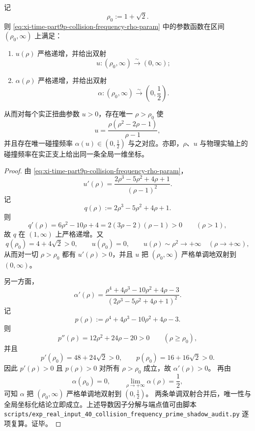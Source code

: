 \begin{theorem}[实正扭曲分支的全局单调坐标化]\label{thm:xi-time-part9p-positive-branch-global-coordinate}
记
\[
\rho_0:=1+\sqrt2.
\]
则 \eqref{eq:xi-time-part9p-collision-frequency-rho-param} 中的参数函数在区间 \((\rho_0,\infty)\) 上满足：
\begin{enumerate}
  \item \(u(\rho)\) 严格递增，并给出双射
  \[
  u:(\rho_0,\infty)\xrightarrow{\sim}(0,\infty);
  \]
  \item \(\alpha(\rho)\) 严格递增，并给出双射
  \[
  \alpha:(\rho_0,\infty)\xrightarrow{\sim}\left(0,\frac12\right).
  \]
\end{enumerate}
从而对每个实正扭曲参数 \(u>0\)，存在唯一 \(\rho>\rho_0\) 使
\[
u=\frac{\rho(\rho^2-2\rho-1)}{\rho-1},
\]
并且存在唯一碰撞频率 \(\alpha(u)\in(0,\tfrac12)\) 与之对应。亦即，\(\rho\)、\(u\) 与物理实轴上的碰撞频率在实正支上给出同一条全局一维坐标。
\end{theorem}
\begin{proof}
由 \eqref{eq:xi-time-part9p-collision-frequency-rho-param}，
\[
u'(\rho)=\frac{2\rho^3-5\rho^2+4\rho+1}{(\rho-1)^2}.
\]
记
\[
q(\rho):=2\rho^3-5\rho^2+4\rho+1.
\]
则
\[
q'(\rho)=6\rho^2-10\rho+4=2(3\rho-2)(\rho-1)>0
\qquad(\rho>1),
\]
故 \(q\) 在 \((1,\infty)\) 上严格递增。又
\[
q(\rho_0)=4+4\sqrt2>0,
\qquad
u(\rho_0)=0,
\qquad
u(\rho)\sim \rho^2\to+\infty
\quad(\rho\to+\infty),
\]
从而对一切 \(\rho>\rho_0\) 都有 \(u'(\rho)>0\)，并且 \(u\) 把 \((\rho_0,\infty)\) 严格单调地双射到 \((0,\infty)\)。

另一方面，
\[
\alpha'(\rho)=
\frac{\rho^4+4\rho^3-10\rho^2+4\rho-3}
{(2\rho^3-5\rho^2+4\rho+1)^2}.
\]
记
\[
p(\rho):=\rho^4+4\rho^3-10\rho^2+4\rho-3.
\]
则
\[
p''(\rho)=12\rho^2+24\rho-20>0
\qquad(\rho\ge \rho_0),
\]
并且
\[
p'(\rho_0)=48+24\sqrt2>0,
\qquad
p(\rho_0)=16+16\sqrt2>0.
\]
因此 \(p'(\rho)>0\) 且 \(p(\rho)>0\) 对所有 \(\rho>\rho_0\) 成立，故 \(\alpha'(\rho)>0\)。
再由
\[
\alpha(\rho_0)=0,
\qquad
\lim_{\rho\to+\infty}\alpha(\rho)=\frac12,
\]
可知 \(\alpha\) 把 \((\rho_0,\infty)\) 严格单调地双射到 \((0,\tfrac12)\)。
两条单调双射合并后，唯一性与全局坐标化结论立即成立。上述导数因子分解与端点值可由脚本 \texttt{scripts/exp\_real\_input\_40\_collision\_frequency\_prime\_shadow\_audit.py} 逐项复算。证毕。
\end{proof}

